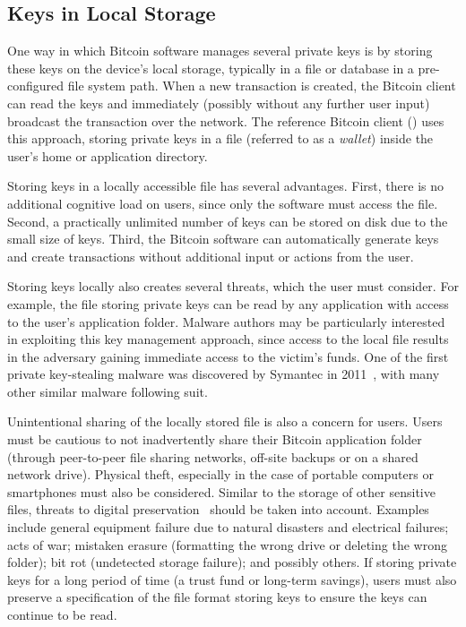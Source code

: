 \subsection{Keys in Local Storage}
\label{sec:localstorage}
One way in which Bitcoin software manages several private keys is by storing these keys on the device's local storage, typically in a file or database in a pre-configured file system path. When a new transaction is created, the Bitcoin client can read the keys and immediately (possibly without any further user input) broadcast the transaction over the network. The reference Bitcoin client (\bitcoinclient) uses this approach, storing private keys in a file (referred to as a \emph{wallet}) inside the user's home or application directory. 

Storing keys in a locally accessible file has several advantages. First, there is no additional cognitive load on users, since only the software must access the file. Second, a practically unlimited number of keys can be stored on disk due to the small size of keys. Third, the Bitcoin software can automatically generate keys and create transactions without additional input or actions from the user. 

Storing keys locally also creates several threats, which the user must consider. For example, the file storing private keys can be read by any application with access to the user's application folder. Malware authors may be particularly interested in exploiting this key management approach, since access to the local file results in the adversary gaining immediate access to the victim's funds. One of the first private key-stealing malware was discovered by Symantec in 2011~\cite{coinbit}, with many other similar malware following suit.


Unintentional sharing of the locally stored file is also a concern for users. Users must be cautious to not inadvertently share their Bitcoin application folder (\eg through peer-to-peer file sharing networks, off-site backups or on a shared network drive). Physical theft, especially in the case of portable computers or smartphones must also be considered. Similar to the storage of other sensitive files, threats to digital preservation~\cite{BKM05} should be taken into account. Examples include general equipment failure due to natural disasters and electrical failures; acts of war; mistaken erasure (\eg formatting the wrong drive or deleting the wrong folder); bit rot (\ie undetected storage failure); and possibly others. If storing private keys for a long period of time (\eg a trust fund or long-term savings), users must also preserve a specification of the file format storing keys to ensure the keys can continue to be read.

